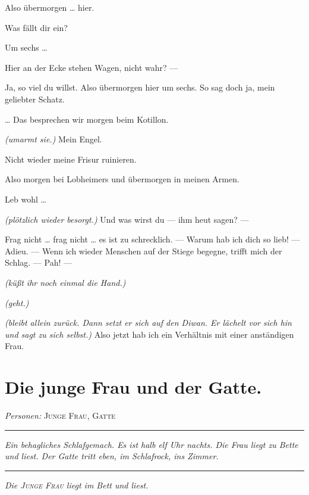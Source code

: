 \documentclass[
	final,
	a4paper,
	ngerman,
	mpinclude = true, %
	twoside = true,
	open = right,
	cleardoublepage = plain,
	DIV = 13,
	BCOR = 1cm,
	titlepage = firstiscover,
	]{scrbook}
\newcommand{\scene}{\section}
\newcommand{\direction}[1]{\textit{(#1)}}
\newcommand{\setting}[1]{\vspace{-0.5\baselineskip}\centering\textit{#1}}
\newenvironment{deletion}{%
		\vspace{0.25\baselineskip}
		\hrule
		\vspace{0.25\baselineskip}
		\color{darkgray}
	}{
		\color{black}
		\vspace{0.25\baselineskip}
		\hrule 
		\vspace{0.25\baselineskip}
	}
\newcommand{\characterlist}[1]{{\begin{center}\textit{Personen:} #1\end{center}}}
\newcommand{\thecharacter}[1]{\textup{\textsc{#1}}\xspace}
\newcommand{\theherr}{\thecharacter{Junger Herr}}
\newcommand{\thefrau}{\thecharacter{Junge Frau}}
\newcommand{\thegatte}{\thecharacter{Gatte}}
\newcommand{\character}[1]{\item[#1:]}
\newcommand{\herr}{\character{\theherr}}
\newcommand{\frau}{\character{\thefrau}}
\begin{document}
\begin{play}
	\herr
	Also übermorgen \ldots{} hier.

	\frau
	Was fällt dir ein?

	\herr
	Um sechs \ldots{}

	\frau
	Hier an der Ecke stehen Wagen, nicht wahr? ---

	\herr
	Ja, so viel du willst. Also übermorgen hier um sechs. So sag doch ja, mein geliebter Schatz.

	\frau
	\ldots{} Das besprechen wir morgen beim Kotillon.

	\herr
	\direction{umarmt sie.} Mein Engel.

	\frau
	Nicht wieder meine Frisur ruinieren.

	\herr
	Also morgen bei Lobheimers und übermorgen in meinen Armen.

	\frau
	Leb wohl \ldots{}

	\herr
	\direction{plötzlich wieder besorgt.} Und was wirst du --- ihm heut sagen? ---

	\frau
	Frag nicht \ldots{} frag nicht \ldots{} es ist zu schrecklich. --- Warum hab ich dich so lieb! --- Adieu. --- Wenn ich wieder Menschen auf der Stiege begegne, trifft mich der Schlag. --- Pah! ---

	\herr
	\direction{küßt ihr noch einmal die Hand.}

	\frau
	\direction{geht.}

	\herr
	\direction{bleibt allein zurück. Dann setzt er sich auf den Diwan. Er lächelt vor sich hin und sagt zu sich selbst.} Also jetzt hab ich ein Verhältnis mit einer anständigen Frau.

\end{play}

\scene{Die junge Frau und der Gatte.}
\characterlist{\thefrau, \thegatte}
\begin{deletion}
\setting{Ein behagliches Schlafgemach. Es ist halb elf Uhr nachts. Die Frau liegt zu Bette und liest. Der Gatte tritt eben, im Schlafrock, ins Zimmer.}
\end{deletion}
\setting{Die \thefrau liegt im Bett und liest.}
\end{document}
